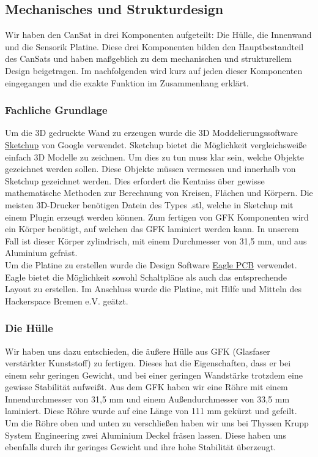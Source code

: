 \subsection{Mechanisches und Strukturdesign}

Wir haben den CanSat in drei Komponenten aufgeteilt: Die Hülle, die Innenwand und die Sensorik Platine. Diese drei Komponenten bilden den Hauptbestandteil des CanSats und haben maßgeblich zu dem mechanischen und strukturellem Design beigetragen. Im nachfolgenden wird kurz auf jeden dieser Komponenten eingegangen und die exakte Funktion im Zusammenhang erklärt.

\subsubsection {Fachliche Grundlage}
Um die 3D gedruckte Wand zu erzeugen wurde die 3D Moddelierungssoftware \href{http://www.sketchup.com/de} {Sketchup} von Google verwendet. Sketchup bietet die Möglichkeit vergleichsweiße einfach 3D Modelle zu zeichnen. Um dies zu tun muss klar sein, welche Objekte gezeichnet werden sollen. Diese Objekte müssen vermessen und innerhalb von Sketchup gezeichnet werden. Dies erfordert die Kentniss über gewisse mathematische Methoden zur Berechnung von Kreisen, Flächen und Körpern. Die meisten 3D-Drucker benötigen Datein des Types .stl, welche in Sketchup mit einem Plugin erzeugt werden können.
Zum fertigen von GFK Komponenten wird ein Körper benötigt, auf welchen das GFK laminiert werden kann. In unserem Fall ist dieser Körper zylindrisch, mit einem Durchmesser von 31,5 mm, und aus Aluminium gefräst. \\
Um die Platine zu erstellen wurde die Design Software \href{http://www.cadsoft.de/eagle-pcb-design-software/} {Eagle PCB} verwendet. Eagle bietet die Möglichkeit sowohl Schaltpläne als auch das entsprechende Layout zu erstellen. Im Anschluss wurde die Platine, mit Hilfe und Mitteln des Hackerspace Bremen e.V. geätzt.

\subsubsection{Die Hülle}
Wir haben uns dazu entschieden, die äußere Hülle aus GFK (Glasfaser verstärkter Kunststoff) zu fertigen. Dieses hat die Eigenschaften, dass er bei einem sehr geringen Gewicht, und bei einer geringen Wandstärke trotzdem eine gewisse Stabilität aufweißt. Aus dem GFK haben wir eine Röhre mit einem Innendurchmesser von 31,5 mm und einem Außendurchmesser von 33,5 mm laminiert. Diese Röhre wurde auf eine Länge von 111 mm gekürzt und gefeilt. Um die Röhre oben und unten zu verschließen haben wir uns bei Thyssen Krupp System Engineering zwei Aluminium Deckel fräsen lassen. Diese haben uns ebenfalls durch ihr geringes Gewicht und ihre hohe Stabilität überzeugt.

